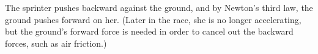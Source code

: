 The sprinter pushes backward against the ground, and by Newton's third law, the ground pushes
forward on her. (Later in the race, she is no longer accelerating, but the ground's forward
force is needed in order to cancel out the backward forces, such as air friction.)



